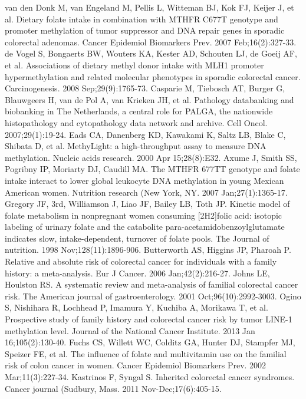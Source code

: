 \begin{thebibliography}{12}
		van den Donk M, van Engeland M, Pellis L, Witteman BJ, Kok FJ, Keijer J, et al. Dietary folate intake in combination with MTHFR C677T genotype and promoter methylation of tumor suppressor and DNA repair genes in sporadic colorectal adenomas. Cancer Epidemiol Biomarkers Prev. 2007 Feb;16(2):327-33.
		de Vogel S, Bongaerts BW, Wouters KA, Kester AD, Schouten LJ, de Goeij AF, et al. Associations of dietary methyl donor intake with MLH1 promoter hypermethylation and related molecular phenotypes in sporadic colorectal cancer. Carcinogenesis. 2008 Sep;29(9):1765-73.
		Casparie M, Tiebosch AT, Burger G, Blauwgeers H, van de Pol A, van Krieken JH, et al. Pathology databanking and biobanking in The Netherlands, a central role for PALGA, the nationwide histopathology and cytopathology data network and archive. Cell Oncol. 2007;29(1):19-24.
		Eads CA, Danenberg KD, Kawakami K, Saltz LB, Blake C, Shibata D, et al. MethyLight: a high-throughput assay to measure DNA methylation. Nucleic acids research. 2000 Apr 15;28(8):E32.
		Axume J, Smith SS, Pogribny IP, Moriarty DJ, Caudill MA. The MTHFR 677TT genotype and folate intake interact to lower global leukocyte DNA methylation in young Mexican American women. Nutrition research (New York, NY. 2007 Jan;27(1):1365-17.
		Gregory JF, 3rd, Williamson J, Liao JF, Bailey LB, Toth JP. Kinetic model of folate metabolism in nonpregnant women consuming [2H2]folic acid: isotopic labeling of urinary folate and the catabolite para-acetamidobenzoylglutamate indicates slow, intake-dependent, turnover of folate pools. The Journal of nutrition. 1998 Nov;128(11):1896-906.
		Butterworth AS, Higgins JP, Pharoah P. Relative and absolute risk of colorectal cancer for individuals with a family history: a meta-analysis. Eur J Cancer. 2006 Jan;42(2):216-27.
		Johns LE, Houlston RS. A systematic review and meta-analysis of familial colorectal cancer risk. The American journal of gastroenterology. 2001 Oct;96(10):2992-3003.
		Ogino S, Nishihara R, Lochhead P, Imamura Y, Kuchiba A, Morikawa T, et al. Prospective study of family history and colorectal cancer risk by tumor LINE-1 methylation level. Journal of the National Cancer Institute. 2013 Jan 16;105(2):130-40.
		Fuchs CS, Willett WC, Colditz GA, Hunter DJ, Stampfer MJ, Speizer FE, et al. The influence of folate and multivitamin use on the familial risk of colon cancer in women. Cancer Epidemiol Biomarkers Prev. 2002 Mar;11(3):227-34.
		Kastrinos F, Syngal S. Inherited colorectal cancer syndromes. Cancer journal (Sudbury, Mass. 2011 Nov-Dec;17(6):405-15.

\end{thebibliography}
